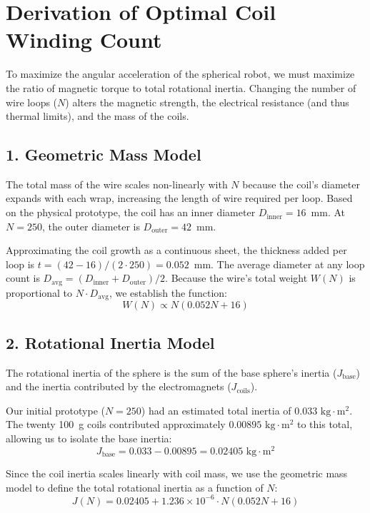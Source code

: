\documentclass[11pt]{article}
\begin{document}
\section{Derivation of Optimal Coil Winding Count}
\label{sec:coil_optimization}

To maximize the angular acceleration of the spherical robot, we must maximize the ratio of magnetic torque to total rotational inertia. Changing the number of wire loops ($N$) alters the magnetic strength, the electrical resistance (and thus thermal limits), and the mass of the coils.

\subsection*{1. Geometric Mass Model}
The total mass of the wire scales non-linearly with $N$ because the coil's diameter expands with each wrap, increasing the length of wire required per loop. Based on the physical prototype, the coil has an inner diameter $D_{\text{inner}} = 16$~mm. At $N=250$, the outer diameter is $D_{\text{outer}} = 42$~mm. 

Approximating the coil growth as a continuous sheet, the thickness added per loop is $t = (42 - 16) / (2 \cdot 250) = 0.052$~mm. The average diameter at any loop count is $D_{\text{avg}} = (D_{\text{inner}} + D_{\text{outer}}) / 2$. Because the wire's total weight $W(N)$ is proportional to $N \cdot D_{\text{avg}}$, we establish the function:
\begin{equation}
    W(N) \propto N(0.052N + 16)
\end{equation}

\subsection*{2. Rotational Inertia Model}
The rotational inertia of the sphere is the sum of the base sphere's inertia ($J_{\text{base}}$) and the inertia contributed by the electromagnets ($J_{\text{coils}}$). 

Our initial prototype ($N=250$) had an estimated total inertia of $0.033 \text{ kg}\cdot\text{m}^2$. The twenty 100~g coils contributed approximately $0.00895 \text{ kg}\cdot\text{m}^2$ to this total, allowing us to isolate the base inertia:
$$J_{\text{base}} = 0.033 - 0.00895 = 0.02405 \text{ kg}\cdot\text{m}^2$$

Since the coil inertia scales linearly with coil mass, we use the geometric mass model to define the total rotational inertia as a function of $N$:
\begin{equation}
    J(N) = 0.02405 + 1.236 \times 10^{-6} \cdot N(0.052N + 16)
\end{equation}
\end{document}
